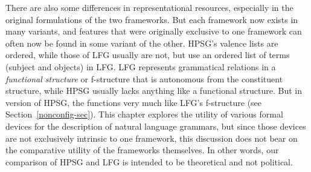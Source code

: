 There are also some differences in representational resources, especially in the original formulations of the two frameworks.
But each framework now exists in many variants, and features that were originally exclusive to one framework can often now be found in some variant of the other.   HPSG's valence lists are ordered, while those of LFG usually are not, but \citet{andrews1999complex} use an ordered list of terms (subject and objects) in LFG.  
LFG represents grammatical relations in a \textit{functional structure} or f-structure that is autonomous from the constituent structure, while HPSG usually lacks anything like a functional structure. 
But in  
version of HPSG, the \compsl functions very much like LFG's f-structure (see Section~\ref{nonconfig-sec}).  This chapter explores the utility of various formal devices for the description of natural language grammars, but since those devices are not exclusively intrinsic to one framework, this discussion does not bear on the comparative utility of the frameworks themselves.  In other words, our comparison of HPSG and LFG is intended to be theoretical and not political.



